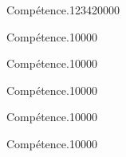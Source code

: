 
\begin{pageParcoursu} %

\begin{ExoCu}{Compétence.}{1234}{2}{0}{0}{0}{0}
  
\end{ExoCu}

\begin{ExoCuN}{Compétence.}{1}{0}{0}{0}{0}

\end{ExoCuN}

\begin{ExoCuN}{Compétence.}{1}{0}{0}{0}{0}

\end{ExoCuN}

\begin{ExoCuN}{Compétence.}{1}{0}{0}{0}{0}

\end{ExoCuN}

\begin{ExoCuN}{Compétence.}{1}{0}{0}{0}{0}

\end{ExoCuN}

\begin{ExoCuN}{Compétence.}{1}{0}{0}{0}{0}

\end{ExoCuN}


\end{pageParcoursu} %
 

